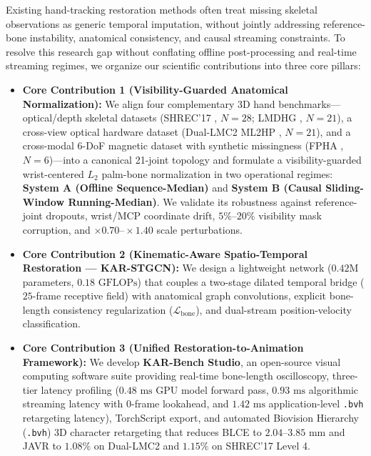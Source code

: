 \documentclass[10pt,twocolumn]{article}
\begin{document}
Existing hand-tracking restoration methods often treat missing skeletal observations as generic temporal imputation, without jointly addressing reference-bone instability, anatomical consistency, and causal streaming constraints. To resolve this research gap without conflating offline post-processing and real-time streaming regimes, we organize our scientific contributions into three core pillars:
\begin{itemize}
    \item \textbf{Core Contribution 1 (Visibility-Guarded Anatomical Normalization):} We align four complementary 3D hand benchmarks---optical/depth skeletal datasets (SHREC'17 \cite{desmedt2017shrec}, $N=28$; LMDHG \cite{boulahia2017dynamic}, $N=21$), a cross-view optical hardware dataset (Dual-LMC2 ML2HP \cite{gilmartin2024dual}, $N=21$), and a cross-modal 6-DoF magnetic dataset with synthetic missingness (FPHA \cite{garcia2018first}, $N=6$)---into a canonical 21-joint topology and formulate a visibility-guarded wrist-centered $L_2$ palm-bone normalization in two operational regimes: \textbf{System A (Offline Sequence-Median)} and \textbf{System B (Causal Sliding-Window Running-Median)}. We validate its robustness against reference-joint dropouts, wrist/MCP coordinate drift, $5\%\text{--}20\%$ visibility mask corruption, and $\times 0.70\text{--}\times 1.40$ scale perturbations.
    \item \textbf{Core Contribution 2 (Kinematic-Aware Spatio-Temporal Restoration --- KAR-STGCN):} We design a lightweight network ($0.42\text{M}$ parameters, $0.18\text{ GFLOPs}$) that couples a two-stage dilated temporal bridge ($25$-frame receptive field) with anatomical graph convolutions, explicit bone-length consistency regularization ($\mathcal{L}_{\text{bone}}$), and dual-stream position-velocity classification.
    \item \textbf{Core Contribution 3 (Unified Restoration-to-Animation Framework):} We develop \textbf{KAR-Bench Studio}, an open-source visual computing software suite providing real-time bone-length oscilloscopy, three-tier latency profiling ($0.48\text{ ms}$ GPU model forward pass, $0.93\text{ ms}$ algorithmic streaming latency with $0$-frame lookahead, and $1.42\text{ ms}$ application-level \texttt{.bvh} retargeting latency), TorchScript export, and automated Biovision Hierarchy (\texttt{.bvh}) 3D character retargeting that reduces BLCE to $2.04\text{--}3.85\text{ mm}$ and JAVR to $1.08\%$ on Dual-LMC2 and $1.15\%$ on SHREC'17 Level 4.
\end{itemize}
\end{document}

